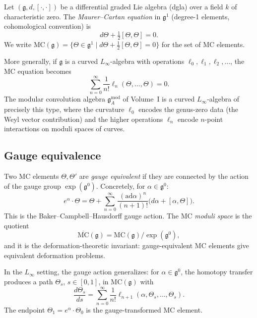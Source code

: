 \documentclass[11pt]{article}
\theoremstyle{definition}
\theoremstyle{remark}
\newcommand{\frakg}{\mathfrak{g}}
\newcommand{\Linf}{L_\infty}
\newcommand{\ad}{\mathrm{ad}}
\newcommand{\MC}{\mathrm{MC}}
\begin{document}
Let $(\frakg, d, [\cdot, \cdot])$ be a differential graded Lie algebra
(dgla) over a field $k$ of characteristic zero. The \emph{Maurer--Cartan
equation} in $\frakg^1$ (degree-1 elements, cohomological convention) is
\begin{equation}\label{eq:mc-equation}
 d\Theta + \tfrac{1}{2}[\Theta, \Theta] = 0.
\end{equation}
We write $\MC(\frakg) = \{ \Theta \in \frakg^1 \mid
d\Theta + \frac{1}{2}[\Theta, \Theta] = 0 \}$ for the set of MC elements.

More generally, if $\frakg$ is a curved $\Linf$-algebra with operations
$\ell_0, \ell_1, \ell_2, \ldots$, the MC equation becomes
\begin{equation}\label{eq:mc-linf}
 \sum_{n=0}^{\infty} \frac{1}{n!} \ell_n(\Theta, \ldots, \Theta) = 0.
\end{equation}
The modular convolution algebra $\frakg^{\mathrm{mod}}_A$ of Volume~I is
a curved $\Linf$-algebra of precisely this type, where the curvature
$\ell_0$ encodes the genus-zero data (the Weyl vector contribution) and
the higher operations $\ell_n$ encode $n$-point interactions on moduli
spaces of curves.

\subsection{Gauge equivalence}
\label{ssec:gauge-equiv}

Two MC elements $\Theta, \Theta'$ are \emph{gauge equivalent} if they are
connected by the action of the gauge group $\exp(\frakg^0)$. Concretely,
for $\alpha \in \frakg^0$:
\begin{equation}\label{eq:gauge-action}
 e^{\alpha} \cdot \Theta
 = \Theta + \sum_{n=0}^{\infty} \frac{(\ad \alpha)^n}{(n+1)!}
 \bigl( d\alpha + [\alpha, \Theta] \bigr).
\end{equation}
This is the Baker--Campbell--Hausdorff gauge action. The MC
\emph{moduli space} is the quotient
\[
 \overline{\MC}(\frakg) = \MC(\frakg) / \exp(\frakg^0),
\]
and it is the deformation-theoretic invariant: gauge-equivalent MC elements
give equivalent deformation problems.

In the $\Linf$ setting, the gauge action generalizes: for $\alpha \in
\frakg^0$, the homotopy transfer produces a path
$\Theta_s$, $s \in [0,1]$, in $\MC(\frakg)$ with
\begin{equation}\label{eq:linf-gauge}
 \frac{d\Theta_s}{ds}
 = \sum_{n=0}^{\infty} \frac{1}{n!}
 \ell_{n+1}(\alpha, \Theta_s, \ldots, \Theta_s).
\end{equation}
The endpoint $\Theta_1 = e^{\alpha} \cdot \Theta_0$ is the gauge-transformed
MC element.
\end{document}

